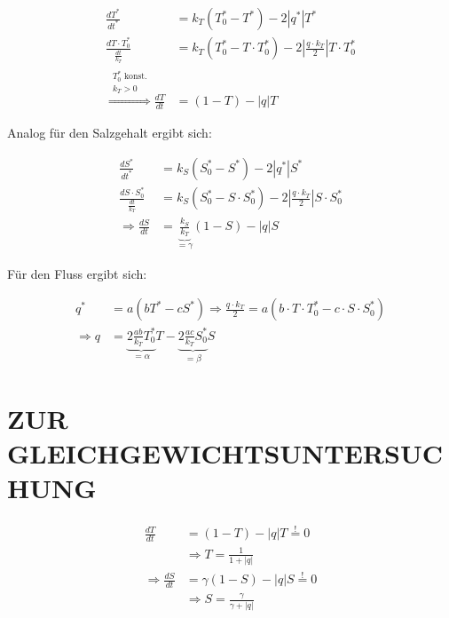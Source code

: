\documentclass[a4paper,twoside]{article}
\begin{document}
	\begin{footnotesize}
	\begin{align*}
		\frac{dT^*}{dt^*} &= k_T\left(T^*_{0} - T^*\right) - 2\left|q^*\right|T^* \\
		\frac{dT \cdot T^*_0}{\frac{dt}{k_T}} &= 
		k_T\left(T^*_{0} - T \cdot T^*_0 \right) - 2\left|\frac{q \cdot k_T}{2}\right|T \cdot T^*_0 \\
		\stackrel{\substack{
			T^*_{0} \textrm{ konst.}\\
			k_T > 0
		}}{\Rightarrow} \frac{dT}{dt} &=
		\left(1 - T\right) - \left|q\right|T
	\end{align*}
	\end{footnotesize}
	Analog für den Salzgehalt ergibt sich:
	\begin{footnotesize}
	\begin{align*}	
		\frac{dS^*}{dt^*} &= k_S\left(S^*_{0} - S^*\right) - 2\left|q^*\right|S^* \\
		\frac{dS \cdot S^*_0}{\frac{dt}{k_T}} &= k_S\left(S^*_{0} - S \cdot S^*_0\right) - 2\left|\frac{q \cdot k_T}{2}\right|S \cdot S^*_0 \\
		\Rightarrow \frac{dS}{dt} &= \underbrace{\frac{k_S}{k_T}}_{=\gamma}\left(1 - S\right) - \left|q\right|S
	\end{align*}
	\end{footnotesize}
	
	Für den Fluss ergibt sich:

	\begin{footnotesize}
	\begin{align*}
		q^* &= a \left( bT^* - cS^* \right)
		\Rightarrow \frac{q \cdot k_T}{2} = a\left(b \cdot T \cdot T^*_0 - c \cdot S \cdot S^*_0 \right) \\
		\Rightarrow q &= \underbrace{2\frac{ab}{k_T}T^*_0}_{=\alpha}T - \underbrace{2\frac{ac}{k_T}S^*_0}_{=\beta}S
	\end{align*}
	\end{footnotesize}
	
		\section*{\uppercase{Zur Gleichgewichtsuntersuchung}\label{sec: Gleichgewichtsuntersuchung}}

	\begin{footnotesize}
	\begin{align*}
		\frac{dT}{dt} &= \left(1 - T\right) - \left|q\right|T \stackrel{!}{=} 0 \\
		&\Rightarrow T = \frac{1}{1+|q|} \\
		\Rightarrow \frac{dS}{dt} &= \gamma \left(1 - S\right) - \left|q\right|S \stackrel{!}{=} 0 \\
		&\Rightarrow S = \frac{\gamma}{\gamma + |q|}
	\end{align*}
	\end{footnotesize}
	
\end{document}
